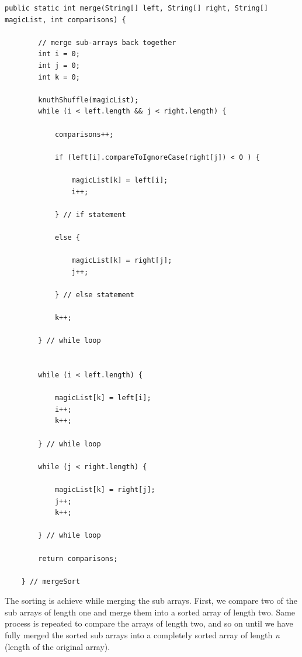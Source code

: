 \documentclass[letterpaper, 10pt]{article}
\begin{document}
\begin{lstlisting}
public static int merge(String[] left, String[] right, String[] magicList, int comparisons) {
		
		// merge sub-arrays back together
		int i = 0;
		int j = 0;
		int k = 0;
 		
		knuthShuffle(magicList);
		while (i < left.length && j < right.length) {
			
			comparisons++;
			
			if (left[i].compareToIgnoreCase(right[j]) < 0 ) {
				
				magicList[k] = left[i];
				i++;
				
			} // if statement
			
			else {
				
				magicList[k] = right[j];
				j++;
				
			} // else statement
			
			k++; 
			
		} // while loop
		
		
		while (i < left.length) {
			
			magicList[k] = left[i];
			i++;
			k++;
			
		} // while loop
		
		while (j < right.length) {
			
			magicList[k] = right[j];
			j++;
			k++;
			
		} // while loop
		
		return comparisons;
		
	} // mergeSort
\end{lstlisting}
The sorting is achieve while merging the sub arrays. First, we compare two of the sub arrays of length one and merge them into a sorted array of length two. Same process is repeated to compare the arrays of length two, and so on until we have fully merged the sorted sub arrays into a completely sorted array of length \textit{n} (length of the original array). 

\pagebreak
\end{document}
